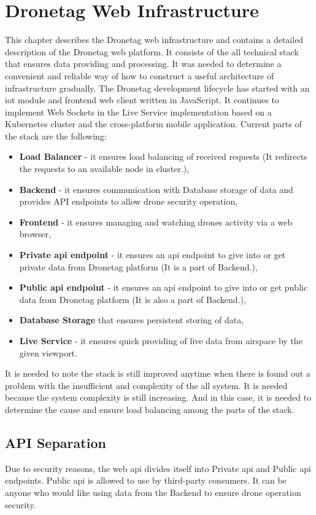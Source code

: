 \chapter{Dronetag Web Infrastructure}\label{ch:dronetag-web-infrastructure}
This chapter describes the Dronetag web infrastructure and contains a detailed description of the Dronetag web platform.
It consists of the all technical stack that ensures data providing and processing.
It was needed to determine a convenient and reliable way of how to construct a useful architecture of infrastructure gradually.
The Dronetag development lifecycle has started with an \acrshort{iot} module and frontend web client written in JavaScript.
It continues to implement Web Sockets in the Live Service implementation based on a Kubernetes cluster and the cross-platform mobile application.
Current parts of the stack are the following:
\begin{itemize}
    \item \textbf{Load Balancer} - it ensures load balancing of received requests (It redirects the requests to an available node in cluster.),
    \item \textbf{Backend} - it ensures communication with Database storage of data and provides API endpoints to allow drone security operation,
    \item \textbf{Frontend} - it ensures managing and watching drones activity via a web browser,
    \item \textbf{Private \acrshort{api} endpoint} - it ensures an \acrshort{api} endpoint to give into or get private data from Dronetag platform (It is a part of Backend.),
    \item \textbf{Public \acrshort{api} endpoint} - it ensures an \acrshort{api} endpoint to give into or get public data from Dronetag platform (It is also a part of Backend.),
    \item \textbf{Database Storage} that ensures persistent storing of data,
    \item \textbf{Live Service} - it ensures quick providing of live data from airspace by the given viewport.
\end{itemize}
\newpage
It is needed to note the stack is still improved anytime when there is found out a problem with the insufficient and complexity of the all system.
It is needed because the system complexity is still increasing.
And in this case, it is needed to determine the cause and ensure load balancing among the parts of the stack.

\section{API Separation}\label{sec:api-separation}
Due to security reasons, the web \acrshort{api} divides itself into Private \acrshort{api} and Public \acrshort{api} endpoints.
Public \acrshort{api} is allowed to use by third-party consumers.
It can be anyone who would like using data from the Backend to ensure drone operation security.


